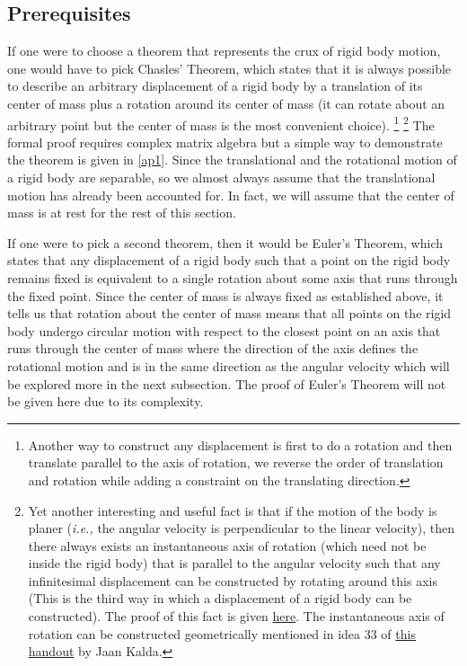 \documentclass[a4paper,12pt]{report}
\begin{document}
\subsection{Prerequisites}
If one were to choose a theorem that represents the crux of rigid body motion, one would have to pick Chasles' Theorem, which states that it is always possible to describe an arbitrary displacement of a rigid body by a translation of its center of mass plus a rotation around its center of mass (it can rotate about an arbitrary point but the center of mass is the most convenient choice). \footnote{Another way to construct any displacement is first to do a rotation and then translate parallel to the axis of rotation, we reverse the order of translation and rotation while adding a constraint on the translating direction.} \footnote{Yet another interesting and useful fact is that if the motion of the body is planer (\textit{i.e.,} the angular velocity is perpendicular to the linear velocity), then there always exists an instantaneous axis of rotation (which need not be inside the rigid body) that is parallel to the angular velocity such that any infinitesimal displacement can be constructed by rotating around this axis (This is the third way in which a displacement of a rigid body can be constructed). The proof of this fact is given \href{https://physics.stackexchange.com/q/541554}{here}. The instantaneous axis of rotation can be constructed geometrically mentioned in idea 33 of \href{https://www.ioc.ee/~kalda/ipho/kin_ENG.pdf}{this handout} by Jaan Kalda.}  The formal proof requires complex matrix algebra but a simple way to demonstrate the theorem is given in \cref{ap1}. Since the translational and the rotational motion of a rigid body are separable, so we almost always assume that the translational motion has already been accounted for. In fact, we will assume that the center of mass is at rest for the rest of this section.

If one were to pick a second theorem, then it would be Euler's Theorem, which states that any displacement of a rigid body such that a point on the rigid body remains fixed is equivalent to a single rotation about some axis that runs through the fixed point. Since the center of mass is always fixed as established above, it tells us that rotation about the center of mass means that all points on the rigid body undergo circular motion with respect to the closest point on an axis that runs through the center of mass where the direction of the axis defines the rotational motion and is in the same direction as the angular velocity which will be explored more in the next subsection. The proof of Euler's Theorem will not be given here due to its complexity.
\end{document}
